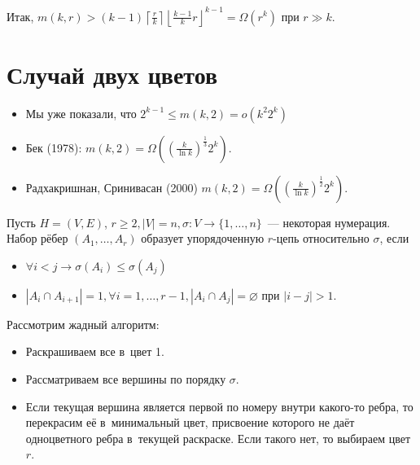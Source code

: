 \documentclass{article}
\begin{document}
Итак, $m(k, r) > (k-1) \left\lceil \frac{r}{k} \right\rceil \left\lfloor
\frac{k - 1}{k}r\right\rfloor^{k-1} = \Omega(r^k)$ при $r \gg k$.

\section{Случай двух цветов}

\begin{itemize}
	\item Мы уже показали, что $2^{k-1} \le m(k, 2) = o(k^2 2^k)$
	\item Бек (1978): $m(k, 2) = \Omega\left( \left( \frac{k}{\ln
		k}\right)^\frac{1}{3} 2^k \right)$.
	\item Радхакришнан, Сринивасан (2000) $m(k, 2) = \Omega\left( \left(
		\frac{k}{\ln k}\right)^\frac{1}{2} 2^k \right)$.
\end{itemize}

\begin{definition}
	Пусть $H = (V, E)$, $r \ge 2, |V| = n, \sigma: V \rightarrow \{1, \ldots,
	n\}$~--- некоторая нумерация. Набор рёбер $(A_1, \ldots, A_r)$ образует
	упорядоченную $r$-цепь относительно $\sigma$, если
	\begin{itemize}
		\item $\forall i < j \rightarrow \sigma(A_i) \le \sigma(A_j)$
		\item $|A_i \cap A_{i+1}| = 1, \forall i = 1, \ldots, r - 1, |A_i \cap A_j|
			= \varnothing$ при $|i - j| > 1$.
	\end{itemize}
\end{definition}

Рассмотрим жадный алгоритм:
\begin{itemize}
	\item Раскрашиваем все в~цвет 1.
	\item Рассматриваем все вершины по порядку $\sigma$.
	\item Если текущая вершина является первой по номеру внутри какого-то ребра,
		то перекрасим её в~минимальный цвет, присвоение которого не даёт
		одноцветного ребра в~текущей раскраске. Если такого нет, то выбираем цвет
		$r$.
\end{itemize}
\end{document}
